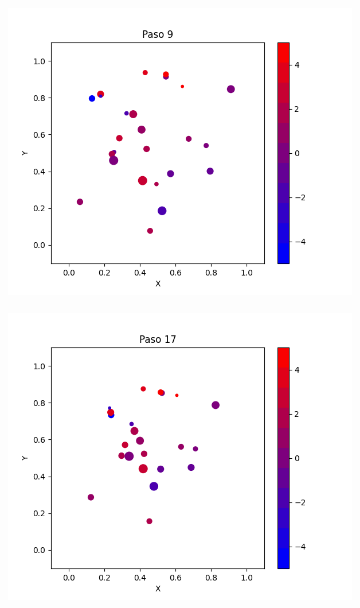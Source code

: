 \documentclass{report}
\begin{document}
\begin{figure}[h]
\begin{subfigure}[b]{0.3\textwidth}
         \centering
         \includegraphics[width=\textwidth]{Images/Images_mc/p9pmc_t09.png}
     \end{subfigure}
     \begin{subfigure}[b]{0.3\textwidth}
         \centering
         \includegraphics[width=\textwidth]{Images/Images_mc/p9pmc_t17.png}
     \end{subfigure}
     \begin{subfigure}[b]{0.3\textwidth}
         \centering

\end{subfigure}
\end{figure}
\end{document}

